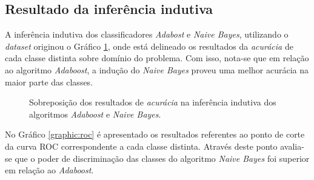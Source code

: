 \subsection{Resultado da inferência indutiva}

A inferência indutiva dos classificadores \textit{Adabost} e 
\textit{Naive Bayes}, utilizando o \textit{dataset} originou o Gráfico 
\ref{graphic:acuracia}, onde está delineado os resultados da 
\textit{acurácia} de cada classe distinta sobre domínio do problema. Com isso, 
nota-se que em relação ao algoritmo \textit{Adaboost}, a indução do 
\textit{Naive Bayes} proveu uma melhor acurácia na maior parte das classes.

\begin{figure}[H]
    \begin{center}
    \end{center}
    \caption{Sobreposição dos resultados de \textit{acurácia} na inferência  
    indutiva dos algoritmos \textit{Adaboost} e \textit{Naive Bayes}.}
    \label{graphic:acuracia}
\end{figure}

No Gráfico \ref{graphic:roc} é apresentado os resultados referentes 
ao ponto de corte da curva ROC correspondente a cada classe distinta. Através 
deste ponto avalia-se que o poder de discriminação das classes do algoritmo 
\textit{Naive Bayes} foi superior em relação ao \textit{Adaboost}. 

